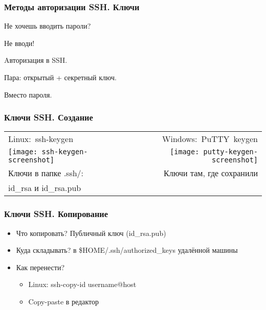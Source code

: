 \begin{frame}
  \frametitle{Методы авторизации SSH. Ключи}

  \alert{Не хочешь вводить пароли?}
  \pause

  \alert{Не вводи!}
  \pause

  \begin{center}
    Aвторизация в SSH.

    Пара: открытый + секретный ключ.

    Вместо пароля.
  \end{center}

\end{frame}

\begin{frame}
  \frametitle{Ключи SSH. Создание}

  \begin{center}

    \begin{tabular}{ l r }
      \hbox{Linux: ssh-keygen} & \hbox{Windows: PuTTY keygen} \\
      \texttt{[image: ssh-keygen-screenshot]} & \texttt{[image: putty-keygen-screenshot]} \\
      Ключи в папке .ssh/: & Ключи там, где сохранили \\
      id\_rsa и id\_rsa.pub &
    \end{tabular}

  \end{center}

\end{frame}


\begin{frame}
  \frametitle{Ключи SSH. Копирование}

  \begin{itemize}
    \item \alert{Что копировать?} Публичный ключ (id\_rsa.pub)  \pause
    \item \alert{Куда складывать?} в \$HOME/.ssh/authorized\_keys \newline удалённой машины \pause
    \item \alert{Как перенести?} \pause
      \begin{itemize}
        \item Linux: ssh-copy-id username@host \pause
        \item Copy-paste в редактор \pause
      \end{itemize}
  \end{itemize}

\end{frame}

